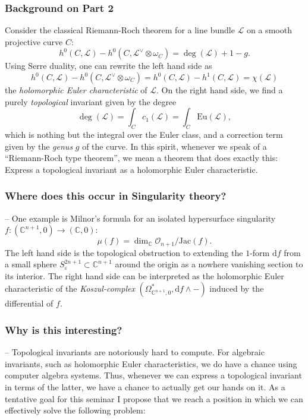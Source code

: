 \documentclass[a4paper]{article}
\newcommand{\D}{\mathrm{d}}
\begin{document}
\subsubsection*{Background on Part 2}
Consider the classical Riemann-Roch theorem for a line bundle $\mathcal L$ 
on a smooth projective curve $C$:
\begin{equation}
  h^0(C, \mathcal L) - h^0(C, \mathcal L^\vee \otimes \omega_C) 
  = 
  \deg(\mathcal L) + 1 - g.
  \label{eqn:RRforCurves}
\end{equation}
Using Serre duality, one can rewrite the left hand side as 
\[
  h^0(C, \mathcal L) - h^0(C, \mathcal L^\vee \otimes \omega_C) 
  = h^0(C, \mathcal L) - h^1(C, \mathcal L) = \chi(\mathcal L)
\]
the \textit{holomorphic Euler characteristic} of $\mathcal L$. 
On the right hand side, we find a purely \textit{topological}
invariant given by the degree
\[
  \deg(\mathcal L) = \int_C c_1(\mathcal L) = \int_C \mathrm{Eu}(\mathcal L),
\]
which is nothing but the integral over the Euler class, and 
a correction term given by the \textit{genus} $g$ of the curve. 
In this spirit, whenever we speak of a ``Riemann-Roch type theorem'', 
we mean a theorem that does exactly this: Express a topological 
invariant as a holomorphic Euler characteristic. 
%
%
\subsubsection*{Where does this occur in Singularity theory?} -- 
One example is Milnor's formula for an isolated hypersurface singularity
$f\colon (\mathbb C^{n+1}, 0) \to (\mathbb C, 0)$: 
\[
  \mu(f) = \dim_\mathbb C \mathcal O_{n+1}/\mathrm{Jac}(f).
\]
The left hand side is the topological obstruction to extending the 
$1$-form $\D f$ from a small sphere $S_\varepsilon^{2n+1}\subset \mathbb C^{n+1}$
around the origin as a nowhere vanishing section to its interior. 
The right hand side can be interpreted as the holomorphic Euler characteristic 
of the \textit{Koszul-complex} $(\Omega^*_{\mathbb C^{n+1}, 0}, \D f \wedge - )$ 
induced by the differential of $f$. 
%
%
\subsubsection*{Why is this interesting?} -- Topological invariants are notoriously 
hard to compute. For algebraic invariants, such as holomorphic Euler characteristics, 
we do have a chance using computer algebra systems. Thus, whenever we can express 
a topological invariant in terms of the latter, we have a chance to actually get 
our hands on it. As a tentative goal for this seminar I propose that we reach a 
position in which we can effectively solve the following problem:
\end{document}
